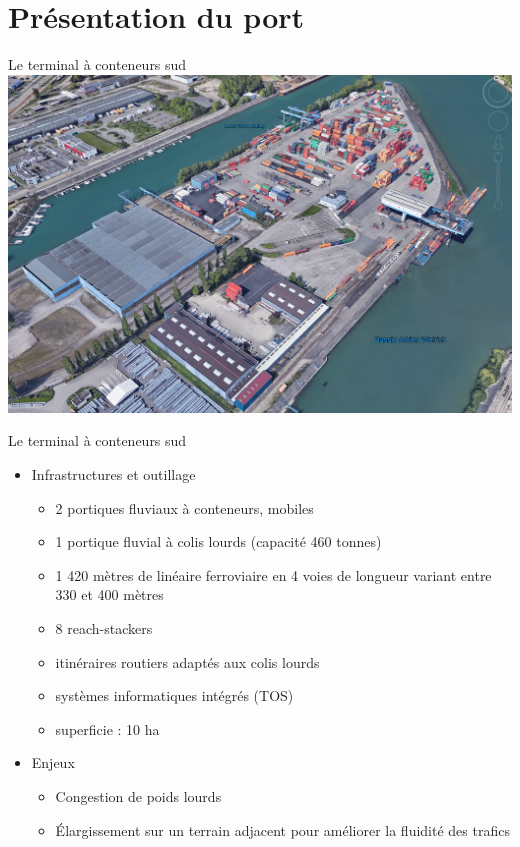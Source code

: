 \section{Présentation du port}

\begin{frame}{Le terminal à conteneurs sud}
  \includegraphics[width=\textwidth]{../images/image14}
\end{frame}

\begin{frame}{Le terminal à conteneurs sud}
  \begin{itemize}
  \item Infrastructures et outillage
    \begin{itemize}
    \item
      2 portiques fluviaux à conteneurs, mobiles
    \item
      1 portique fluvial à colis lourds (capacité 460 tonnes)
    \item
      1 420 mètres de linéaire ferroviaire en 4 voies de longueur variant entre 330 et 400 mètres
    \item
      8 reach-stackers
    \item
      itinéraires routiers adaptés aux colis lourds
    \item
      systèmes informatiques intégrés (TOS)
    \item
      superficie : 10 ha
    \end{itemize}
    \vfill
  \item Enjeux
    \begin{itemize}
    \item Congestion de poids lourds
    \item \'Elargissement sur un terrain adjacent pour améliorer la fluidité des trafics
    \end{itemize}
  \end{itemize}
\end{frame}

